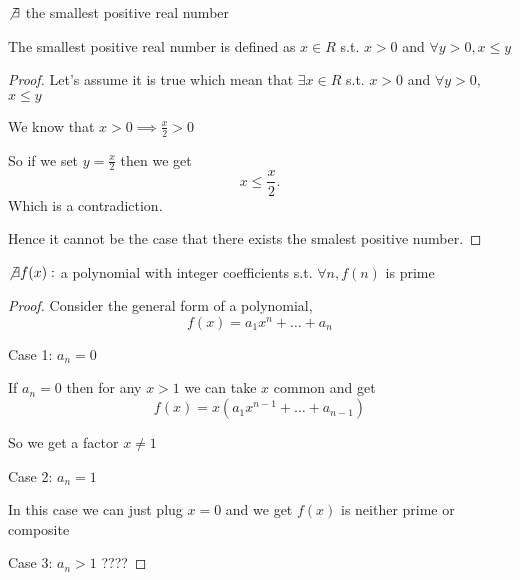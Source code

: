 \begin{eg}
    $\not \exists$ the smallest positive real number
    
    The smallest positive real number is defined as $x \in R$ s.t.  $x > 0$ and  $\forall y > 0, x \leq y$
\end{eg}
\begin{proof}
    Let's assume it is true which mean that $\exists x \in R$ s.t.  $x > 0$ and  $\forall y > 0$,  $x \leq y$

    We know that $x > 0 \implies \frac{x}{2} > 0$ 

    So if we set $y = \frac{x}{2}$ then we get \[
    x \leq \frac{x}{2}
    .\] 
    Which is a contradiction.

    Hence it cannot be the case that there exists the smalest positive number.
\end{proof}
\begin{eg}
    $\not \exists f(x): $ a polynomial with integer coefficients s.t.  $\forall n, f(n)$ is prime
\end{eg}
\begin{proof}
    Consider the general form of a polynomial, 
    $$ f(x) = a_1x^n + \dots + a_n $$ 

    Case 1: $a_n = 0$

    If  $a_n=0$ then for any $x > 1$ we can take $x$ common and get $$f(x) = x(a_1x^{n-1}+\dots+a_{n-1})$$

    So we get a factor $x \ne 1$

    Case 2:  $a_n = 1$

    In this case we can just plug  $x = 0$ and we get $f(x)$ is neither prime or composite

Case 3: $a_n > 1$
????
    
\end{proof}

